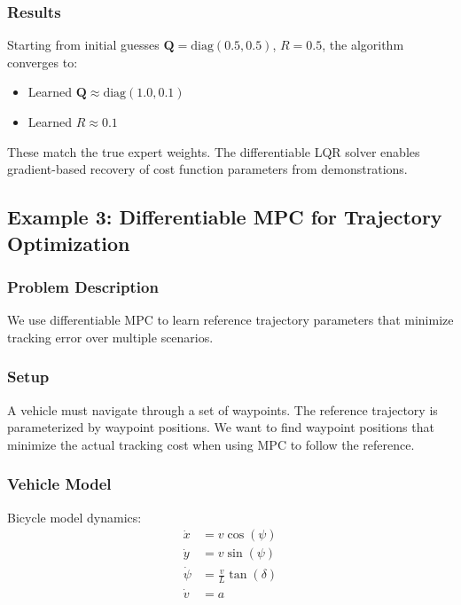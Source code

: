 \subsubsection{Results}

Starting from initial guesses $\mathbf{Q} = \text{diag}(0.5, 0.5)$, $R = 0.5$, the algorithm converges to:
\begin{itemize}
    \item Learned $\mathbf{Q} \approx \text{diag}(1.0, 0.1)$
    \item Learned $R \approx 0.1$
\end{itemize}

These match the true expert weights. The differentiable LQR solver enables gradient-based recovery of cost function parameters from demonstrations.

\subsection{Example 3: Differentiable MPC for Trajectory Optimization}

\subsubsection{Problem Description}

We use differentiable MPC to learn reference trajectory parameters that minimize tracking error over multiple scenarios.

\subsubsection{Setup}

A vehicle must navigate through a set of waypoints. The reference trajectory is parameterized by waypoint positions. We want to find waypoint positions that minimize the actual tracking cost when using MPC to follow the reference.

\subsubsection{Vehicle Model}

Bicycle model dynamics:
\begin{align}
\dot{x} &= v \cos(\psi) \\
\dot{y} &= v \sin(\psi) \\
\dot{\psi} &= \frac{v}{L} \tan(\delta) \\
\dot{v} &= a
\end{align}

